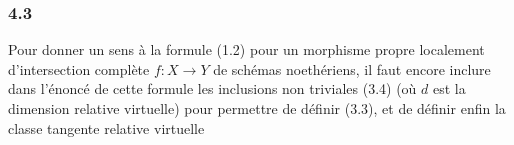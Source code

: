 \subsubsection*{4.3}
Pour donner un sens \`a la formule (1.2) pour un morphisme propre localement d'intersection compl\`ete $f:X\to Y$ de sch\'emas noeth\'eriens, il faut encore inclure dans l'\'enonc\'e de cette formule les inclusions non triviales (3.4) (o\`u $d$ est la dimension relative virtuelle) pour permettre de d\'efinir (3.3), et de d\'efinir enfin la classe tangente relative virtuelle
